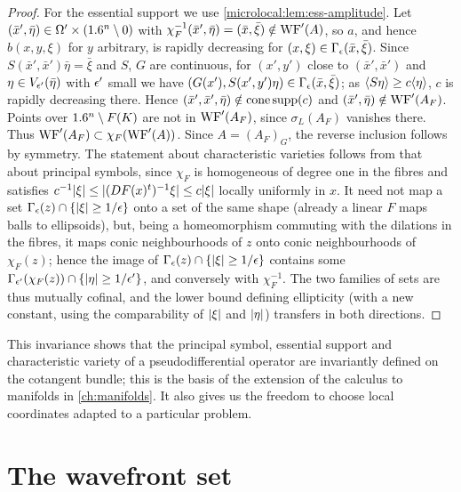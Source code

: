 \begin{proof}
  For the essential support we use \cref{microlocal:lem:ess-amplitude}. Let
  $(\bar x',\bar\eta)\in\Omega'\times(1.6^n\setminus0)$ with
  $\chi_F^{-1}(\bar x',\bar\eta)=(\bar x,\bar\xi)\notin\operatorname{WF}'(A)$, so $a$, and
  hence $b(x,y,\xi)$ for $y$ arbitrary, is rapidly decreasing for
  $(x,\xi)\in\Gamma_\epsilon(\bar x,\bar\xi)$. Since $S(\bar x',\bar x')\bar\eta=\bar\xi$
  and $S$, $G$ are continuous, for $(x',y')$ close to $(\bar x',\bar x')$ and
  $\eta\in V_{\epsilon'}(\bar\eta)$ with $\epsilon'$ small we have
  $(G(x'),S(x',y')\eta)\in\Gamma_\epsilon(\bar x,\bar\xi)$; as
  $\langle S\eta\rangle\ge c\langle \eta\rangle$, $c$ is rapidly decreasing there. Hence $(\bar
  x',\bar x',\bar\eta)\notin\operatorname{cone\,supp}(c)$ and $(\bar x',\bar\eta)\notin\operatorname{WF}'(A_F)$.
  Points over $1.6^n\setminus F(K)$ are not in $\operatorname{WF}'(A_F)$, since
  $\sigma_L(A_F)$ vanishes there. Thus $\operatorname{WF}'(A_F)\subset\chi_F(\operatorname{WF}'(A))$.
  Since $A=(A_F)_G$, the reverse inclusion follows by symmetry. The
  statement about characteristic varieties follows from that about principal
  symbols, since $\chi_F$ is homogeneous of degree one in the fibres and
  satisfies $c^{-1}\lvert \xi\rvert\le\lvert (DF(x)^t)^{-1}\xi\rvert\le c\lvert \xi\rvert$ locally
  uniformly in $x$. It need not map a set $\Gamma_\epsilon(z)\cap\{\lvert \xi\rvert\ge
  1/\epsilon\}$ onto a set of the same shape (already a linear $F$ maps balls to
  ellipsoids), but, being a homeomorphism commuting with the dilations in the
  fibres, it maps conic neighbourhoods of $z$ onto conic neighbourhoods of
  $\chi_F(z)$; hence the image of $\Gamma_\epsilon(z)\cap\{\lvert \xi\rvert\ge1/\epsilon\}$
  contains some $\Gamma_{\epsilon'}(\chi_F(z))\cap\{\lvert \eta\rvert\ge1/\epsilon'\}$, and
  conversely with $\chi_F^{-1}$. The two families of sets are thus mutually
  cofinal, and the lower bound defining ellipticity (with a new constant,
  using the comparability of $\lvert \xi\rvert$ and $\lvert \eta\rvert$) transfers in both
  directions.
\end{proof}

This invariance shows that the principal symbol, essential support and
characteristic variety of a pseudodifferential operator are invariantly
defined on the cotangent bundle; this is the basis of the extension of the
calculus to manifolds in \cref{ch:manifolds}. It also gives us the freedom to
choose local coordinates adapted to a particular problem.

\section{The wavefront set}\label{microlocal:sec:wf}

